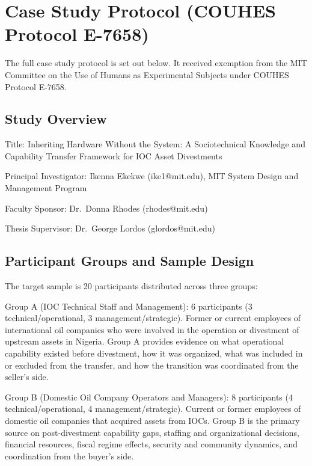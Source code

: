 \hypertarget{case-study-protocol-couhes-protocol-e-7658}{%
\chapter{Case Study Protocol (COUHES Protocol
E-7658)}\label{case-study-protocol-couhes-protocol-e-7658}}

The full case study protocol is set out below. It received exemption
from the MIT Committee on the Use of Humans as Experimental Subjects
under COUHES Protocol E-7658.

\hypertarget{study-overview}{%
\section{Study Overview}\label{study-overview}}

Title: Inheriting Hardware Without the System: A Sociotechnical
Knowledge and Capability Transfer Framework for IOC Asset Divestments

Principal Investigator: Ikenna Ekekwe (ike1@mit.edu), MIT System Design
and Management Program

Faculty Sponsor: Dr.~Donna Rhodes (rhodes@mit.edu)

Thesis Supervisor: Dr.~George Lordos (glordos@mit.edu)

\hypertarget{participant-groups-and-sample-design}{%
\section{Participant Groups and Sample
Design}\label{participant-groups-and-sample-design}}

The target sample is 20 participants distributed across three groups:

Group A (IOC Technical Staff and Management): 6 participants (3
technical/operational, 3 management/strategic). Former or current
employees of international oil companies who were involved in the
operation or divestment of upstream assets in Nigeria. Group A provides
evidence on what operational capability existed before divestment, how
it was organized, what was included in or excluded from the transfer,
and how the transition was coordinated from the seller's side.

Group B (Domestic Oil Company Operators and Managers): 8 participants (4
technical/operational, 4 management/strategic). Current or former
employees of domestic oil companies that acquired assets from IOCs.
Group B is the primary source on post-divestment capability gaps,
staffing and organizational decisions, financial resources, fiscal
regime effects, security and community dynamics, and coordination from
the buyer's side.

